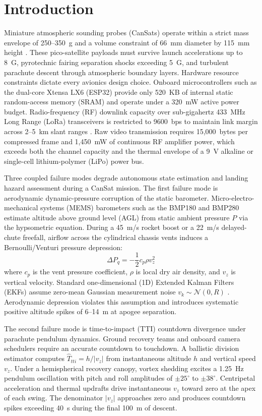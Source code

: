 \documentclass[conference]{IEEEtran}
\begin{document}
\section{Introduction}
Miniature atmospheric sounding probes (CanSats) operate within a strict mass envelope of 250--350~g and a volume constraint of 66~mm diameter by 115~mm height \cite{cansat_overview}. These pico-satellite payloads must survive launch accelerations up to 8~G, pyrotechnic fairing separation shocks exceeding 5~G, and turbulent parachute descent through atmospheric boundary layers. Hardware resource constraints dictate every avionics design choice. Onboard microcontrollers such as the dual-core Xtensa LX6 (ESP32) provide only 520~KB of internal static random-access memory (SRAM) and operate under a 320~mW active power budget. Radio-frequency (RF) downlink capacity over sub-gigahertz 433~MHz Long Range (LoRa) transceivers is restricted to 9600~bps to maintain link margin across 2--5~km slant ranges \cite{lora_telemetry}. Raw video transmission requires 15,000~bytes per compressed frame and 1,450~mW of continuous RF amplifier power, which exceeds both the channel capacity and the thermal envelope of a 9~V alkaline or single-cell lithium-polymer (LiPo) power bus.

Three coupled failure modes degrade autonomous state estimation and landing hazard assessment during a CanSat mission. The first failure mode is aerodynamic dynamic-pressure corruption of the static barometer. Micro-electro-mechanical systems (MEMS) barometers such as the BMP180 and BMP280 estimate altitude above ground level (AGL) from static ambient pressure $P$ via the hypsometric equation. During a 45~m/s rocket boost or a 22~m/s delayed-chute freefall, airflow across the cylindrical chassis vents induces a Bernoulli/Venturi pressure depression:
\begin{equation}
\Delta P_q = -\frac{1}{2} c_p \rho v_z^2
\label{eq:venturi_intro}
\end{equation}
where $c_p$ is the vent pressure coefficient, $\rho$ is local dry air density, and $v_z$ is vertical velocity. Standard one-dimensional (1D) Extended Kalman Filters (EKFs) assume zero-mean Gaussian measurement noise $v_k \sim \mathcal{N}(0, R)$ \cite{kalman_baro_imu}. Aerodynamic depression violates this assumption and introduces systematic positive altitude spikes of 6--14~m at apogee separation.

The second failure mode is time-to-impact (TTI) countdown divergence under parachute pendulum dynamics. Ground recovery teams and onboard camera schedulers require an accurate countdown to touchdown. A ballistic division estimator computes $\hat{T}_{tti} = h / |v_z|$ from instantaneous altitude $h$ and vertical speed $v_z$. Under a hemispherical recovery canopy, vortex shedding excites a 1.25~Hz pendulum oscillation with pitch and roll amplitudes of $\pm 25^\circ$ to $\pm 38^\circ$. Centripetal acceleration and thermal updrafts drive instantaneous $v_z$ toward zero at the apex of each swing. The denominator $|v_z|$ approaches zero and produces countdown spikes exceeding 40~s during the final 100~m of descent.
\end{document}
